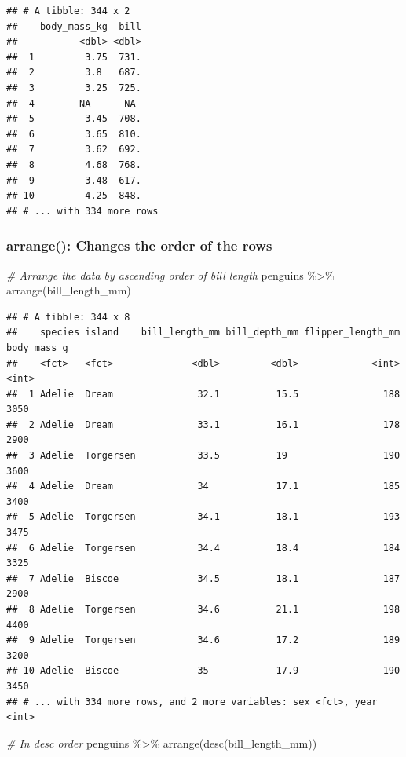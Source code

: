 \documentclass[
]{article}
\newenvironment{Shaded}{\begin{snugshade}}{\end{snugshade}}
\newcommand{\CommentTok}[1]{\textcolor[rgb]{0.56,0.35,0.01}{\textit{#1}}}
\newcommand{\FunctionTok}[1]{\textcolor[rgb]{0.00,0.00,0.00}{#1}}
\newcommand{\NormalTok}[1]{#1}
\newcommand{\SpecialCharTok}[1]{\textcolor[rgb]{0.00,0.00,0.00}{#1}}
\begin{document}
\begin{verbatim}
## # A tibble: 344 x 2
##    body_mass_kg  bill
##           <dbl> <dbl>
##  1         3.75  731.
##  2         3.8   687.
##  3         3.25  725.
##  4        NA      NA 
##  5         3.45  708.
##  6         3.65  810.
##  7         3.62  692.
##  8         4.68  768.
##  9         3.48  617.
## 10         4.25  848.
## # ... with 334 more rows
\end{verbatim}

\hypertarget{arrange-changes-the-order-of-the-rows}{%
\subsubsection{arrange(): Changes the order of the
rows}\label{arrange-changes-the-order-of-the-rows}}

\begin{Shaded}
\begin{Highlighting}[]
\CommentTok{\# Arrange the data by ascending order of bill length}
\NormalTok{penguins }\SpecialCharTok{\%\textgreater{}\%} 
  \FunctionTok{arrange}\NormalTok{(bill\_length\_mm)}
\end{Highlighting}
\end{Shaded}

\begin{verbatim}
## # A tibble: 344 x 8
##    species island    bill_length_mm bill_depth_mm flipper_length_mm body_mass_g
##    <fct>   <fct>              <dbl>         <dbl>             <int>       <int>
##  1 Adelie  Dream               32.1          15.5               188        3050
##  2 Adelie  Dream               33.1          16.1               178        2900
##  3 Adelie  Torgersen           33.5          19                 190        3600
##  4 Adelie  Dream               34            17.1               185        3400
##  5 Adelie  Torgersen           34.1          18.1               193        3475
##  6 Adelie  Torgersen           34.4          18.4               184        3325
##  7 Adelie  Biscoe              34.5          18.1               187        2900
##  8 Adelie  Torgersen           34.6          21.1               198        4400
##  9 Adelie  Torgersen           34.6          17.2               189        3200
## 10 Adelie  Biscoe              35            17.9               190        3450
## # ... with 334 more rows, and 2 more variables: sex <fct>, year <int>
\end{verbatim}

\begin{Shaded}
\begin{Highlighting}[]
\CommentTok{\# In desc order}
\NormalTok{penguins }\SpecialCharTok{\%\textgreater{}\%} 
  \FunctionTok{arrange}\NormalTok{(}\FunctionTok{desc}\NormalTok{(bill\_length\_mm))}
\end{Highlighting}
\end{Shaded}
\end{document}
